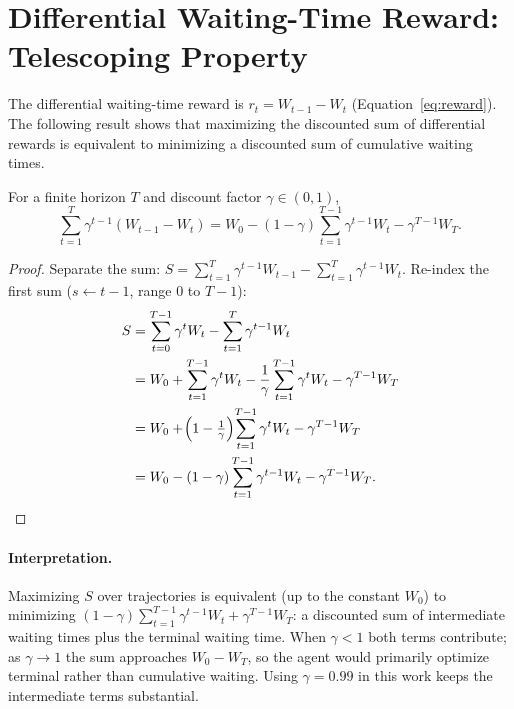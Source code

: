 \section{Differential Waiting-Time Reward: Telescoping Property}
\label{sec:Appendix_reward_telescope}

The differential waiting-time reward is $r_t = W_{t-1} - W_t$ (Equation~\ref{eq:reward}). The following result shows that maximizing the discounted sum of differential rewards is equivalent to minimizing a discounted sum of cumulative waiting times.

\begin{proposition}
\label{prop:telescope}
For a finite horizon $T$ and discount factor $\gamma\in(0,1)$,
\begin{equation}
  \sum_{t=1}^{T}\gamma^{t-1}(W_{t-1}-W_t)
  = W_0
    - (1-\gamma)\sum_{t=1}^{T-1}\gamma^{t-1}W_t
    - \gamma^{T-1}W_T.
  \label{eq:telescope}
\end{equation}
\end{proposition}

\begin{proof}
Separate the sum: $S = \sum_{t=1}^{T}\gamma^{t-1}W_{t-1} - \sum_{t=1}^{T}\gamma^{t-1}W_t$.
Re-index the first sum ($s \leftarrow t-1$, range $0$ to $T-1$):
\begin{align*}
  S &= \sum_{t=0}^{T-1}\gamma^{t}W_t
       - \sum_{t=1}^{T}\gamma^{t-1}W_t \\
    &= W_0
       + \sum_{t=1}^{T-1}\gamma^{t}W_t
       - \frac{1}{\gamma}\sum_{t=1}^{T-1}\gamma^{t}W_t
       - \gamma^{T-1}W_T \\
    &= W_0
       + \!\Bigl(1-\tfrac{1}{\gamma}\Bigr)\!\sum_{t=1}^{T-1}\gamma^{t}W_t
       - \gamma^{T-1}W_T \\
    &= W_0
       - (1-\gamma)\sum_{t=1}^{T-1}\gamma^{t-1}W_t
       - \gamma^{T-1}W_T.
\end{align*}
\end{proof}

\paragraph{Interpretation.} Maximizing $S$ over trajectories is equivalent (up to the constant $W_0$) to minimizing $(1-\gamma)\sum_{t=1}^{T-1}\gamma^{t-1}W_t + \gamma^{T-1}W_T$: a discounted sum of intermediate waiting times plus the terminal waiting time. When $\gamma<1$ both terms contribute; as $\gamma\to 1$ the sum approaches $W_0 - W_T$, so the agent would primarily optimize terminal rather than cumulative waiting. Using $\gamma=0.99$ in this work keeps the intermediate terms substantial.

